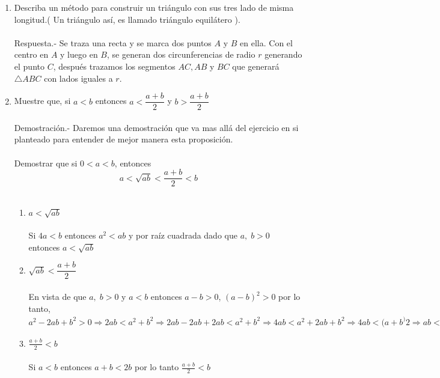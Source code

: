 \documentclass[10pt]{article}
\begin{document}
\begin{enumerate}
	\item Describa un método para construir un triángulo con sus tres lado de misma longitud.( Un triángulo así, es llamado triángulo equilátero ).\\\\
	Respuesta.-\; Se traza una recta y se marca dos puntos $A$ y $B$ en ella. Con el centro en $A$ y luego en $B$, se generan dos circunferencias de radio $r$ generando el punto $C$, después trazamos los segmentos $AC, AB$ y $BC$ que generará $\triangle ABC$ con lados iguales a $r$.
	\begin{center}
	\end{center}

	\item Muestre que, si $a<b$ entonces $a<\dfrac{a+b}{2}$ y $b>\dfrac{a+b}{2}$\\\\
	Demostración.-\; Daremos una demostración que va mas allá del ejercicio en si planteado para entender de mejor manera esta proposición.\\\\
	Demostrar que si $0<a < b$, entonces $$a<\sqrt{ab}<\dfrac{a+b}{2} < b$$\\
	\begin{enumerate}[1.]
	    \item $a<\sqrt{ab}$\\\\
Si \; $4a<b$ entonces $a^2<ab$ y por raíz cuadrada dado que $a,\;b>0$ entonces $a<\sqrt{ab}$\\
	    \item $\sqrt{ab}<\dfrac{a+b}{2}$\\\\
En vista de que $a, \; b > 0$ y $a<b$ entonces $a-b>0$, \; $(a-b)^2>0$ por lo tanto, $a^2-2ab+b^2>0 \Rightarrow 2ab< a^2+b^2 \Rightarrow 2ab-2ab+2ab<a^2+b^2 \Rightarrow 4ab < a^2+2ab +b^2 \Rightarrow 4ab < (a+b^)2 \Rightarrow ab < \displaystyle \left( \frac{a+b}{2} \right) ^2 \Rightarrow \sqrt{ab}<\frac{a+b}{2} $ \\
	    \item $\displaystyle\frac{a+b}{2}<b$\\\\
Si $a<b$ entonces $a+b<2b$ por lo tanto $\displaystyle\frac{a+b}{2}<b$\\\\
	\end{enumerate}


\end{enumerate}
\end{document}

